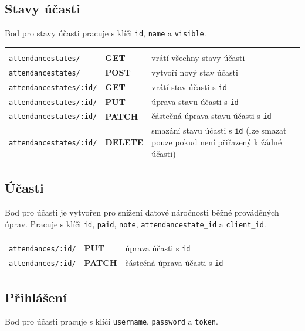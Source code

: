         \subsection{Stavy účasti}
        Bod pro stavy účasti pracuje s klíči \verb|id|, \verb|name| a \verb|visible|.
        
            {\centering
            \begin{tabular}{p{\apiA\textwidth} p{\apiB\textwidth} p{\apiC\textwidth}}&&\\
                \verb|attendancestates/|    & \textbf{GET}      & vrátí všechny stavy účasti\\
                \verb|attendancestates/|    & \textbf{POST}     & vytvoří nový stav účasti\\
                \verb|attendancestates/:id/|& \textbf{GET}      & vrátí stav účasti s \verb|id|\\
                \verb|attendancestates/:id/|& \textbf{PUT}      & úprava stavu účasti s \verb|id|\\
                \verb|attendancestates/:id/|& \textbf{PATCH}    & částečná úprava stavu účasti s \verb|id|\\
                \verb|attendancestates/:id/|& \textbf{DELETE}   & smazání stavu účasti s \verb|id| (lze smazat pouze pokud není přiřazený k žádné účasti)\\
            \end{tabular}}
            
        \subsection{Účasti}
        Bod pro účasti je vytvořen pro snížení datové náročnosti běžné prováděných úprav. Pracuje s klíči \verb|id|, \verb|paid|, \verb|note|, \verb|attendancestate_id| a \verb|client_id|.
        
            {\centering
            \begin{tabular}{p{\apiA\textwidth} p{\apiB\textwidth} p{\apiC\textwidth}}&&\\
                \verb|attendances/:id/|     & \textbf{PUT}      & úprava účasti s \verb|id|\\
                \verb|attendances/:id/|     & \textbf{PATCH}    & částečná úprava účasti s \verb|id|\\
            \end{tabular}}
            
        \subsection{Přihlášení}
        Bod pro účasti pracuje s klíči \verb|username|, \verb|password| a \verb|token|.
        
